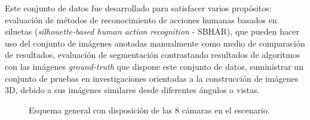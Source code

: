 Este conjunto de datos fue desarrollado para satisfacer varios propósitos: evaluación de métodos de reconocimiento de acciones humanas basados en siluetas (\textit{silhouette-based human action recognition} - SBHAR), que pueden hacer uso del conjunto de imágenes anotadas manualmente como medio de comparación de resultados, evaluación de segmentación contrastando resultados de algoritmos con las imágenes \textit{ground-truth} que dispone este conjunto de datos, suministrar un conjunto de pruebas en investigaciones orientadas a la construcción de imágenes 3D, debido a sus imágenes similares desde diferentes ángulos o vistas.

\begin{figure}
\centering     %
{}
\caption[Disposición de las 8 cámaras sobre el escenario]{Esquema general con disposición de las 8 cámaras en el escenario. }
\label{fig:muhavi_cameras}
\end{figure}



